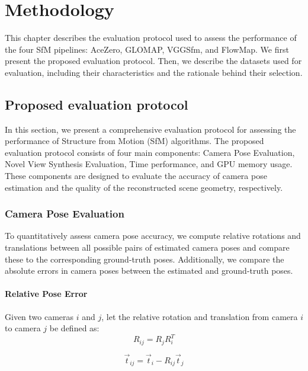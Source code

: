 \chapter{Methodology}\label{chap:methodology}

This chapter describes the evaluation protocol used to assess the performance of the four SfM pipelines: AceZero, GLOMAP, VGGSfm, and FlowMap.
We first present the proposed evaluation protocol. Then, we describe the datasets used for evaluation, including their characteristics and the rationale behind their selection.

\section{Proposed evaluation protocol}\label{sec:proposed-evaluation-protocol}

In this section, we present a comprehensive evaluation protocol for assessing the performance of Structure from Motion (SfM) algorithms.
The proposed evaluation protocol consists of four main components: Camera Pose Evaluation, Novel View Synthesis Evaluation, Time performance, and GPU memory usage.
These components are designed to evaluate the accuracy of camera pose estimation and the quality of the reconstructed scene geometry, respectively.

\subsection{Camera Pose Evaluation}
To quantitatively assess camera pose accuracy, we compute relative rotations and translations between all possible pairs of estimated camera poses and compare these to the corresponding ground-truth poses.
Additionally, we compare the absolute errors in camera poses between the estimated and ground-truth poses.

\subsubsection{Relative Pose Error}
Given two cameras \( i \) and \( j \), let the relative rotation and translation from camera \( i \) to camera \( j \) be defined as:
\begin{equation}
    R_{ij} = R_j R_i^T
\end{equation}

\begin{equation}
    \vec{t}_{ij} = \vec{t}_i - R_{ij} \vec{t}_j
\end{equation}

